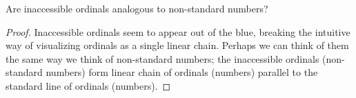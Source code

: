 \begin{question}
  Are inaccessible ordinals analogous to non-standard numbers?
\end{question}
\begin{proof}
  Inaccessible ordinals seem to appear out of the blue, breaking the
  intuitive way of visualizing ordinals as a single linear chain.
  Perhaps we can think of them the same way we think of non-standard
  numbers; the inaccessible ordinals (non-standard numbers) form linear
  chain of ordinals (numbers) parallel to the standard line of ordinals
  (numbers).
\end{proof}

